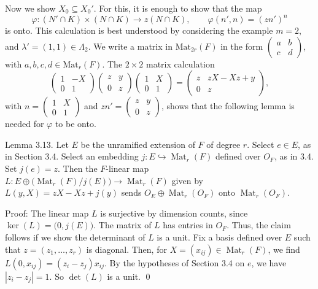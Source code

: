 \documentclass{amsart}
\begin{document}
Now we show $X_0\subseteq X_0'$.  For this, it is enough to show
that the map $$\varphi:(N'\cap K)\times (N\cap K)\to z(N\cap K),\qquad
      \varphi(n',n) = (zn')^n$$
is onto.  This calculation is best understood by considering the
example $m=2$, and $\lambda'=(1,1)\in \Lambda_2$.
We write a matrix in $\text{Mat}_{2r}(F)$ in the form
$\begin{pmatrix}  a&b\\c&d\end{pmatrix}$, with $a,b,c,d\in\text{Mat}_r(F)$.
The $2\times2$ matrix calculation
%
$$\begin{pmatrix}  1&-X\\0&1\end{pmatrix}
  \begin{pmatrix}  z&y\\0&z\end{pmatrix}
  \begin{pmatrix}  1&X\\0&1\end{pmatrix} =
  \begin{pmatrix}  z& zX-Xz+y\\0&z\end{pmatrix},$$
  with 
  $n=\begin{pmatrix} 1&X\\0&1\end{pmatrix}$ and 
  $zn'=\begin{pmatrix}  z&y\\0&z\end{pmatrix}$,
%
shows that the following lemma is needed for $\varphi$ to be onto.

\proclaim Lemma {3.13}.
Let $E$ be the unramified extension of $F$ of degree $r$.
Select $e\in E$, as in Section 3.4.  Select an embedding
  $ j : E \hookrightarrow \operatorname{Mat}_r (F) $ defined
  over $O_F$,
as in\/ {\rm 3.4}.
Set $ j(e) = z$.
Then the $F$-linear map
  $ L :
    E \oplus 
    \bigl(
      \operatorname{Mat}_r (F) \big/ j (E)
    \bigr)
    \to
    \operatorname{Mat}_r (F) $
given by 
  $L (y,X) =z X - X z + j (y) $
sends
  $ O_E \oplus \operatorname{Mat}_r (O_F) $
{\rm onto}
  $ \operatorname{Mat}_r (O_F) $.
\finishproclaim

\pproclaim Proof:
The linear map
  $L$ is surjective by dimension counts, since
  $ \ker (L) = 
    \bigl(
       0, j (E)
    \bigr) $.
The matrix of $L$ has entries in
  $ O_F $.
Thus, the claim follows if we show the determinant of $L$ is a unit.
Fix a basis defined over $E$ such that 
  $ z = (z_1,\ldots,z_r) $ 
is diagonal.
Then, for
  $ X= (x_{ij}) \in \operatorname{Mat}_r (F) $,
  we find $ L(0,x_{ij}) = (z_i - z_j) x_{ij} $.
By the hypotheses of Section 3.4 on $e$, we have
  $ |z_i - z_j| = 1 $.
So 
  $ \det (L) $
is a unit.
\qed
\finishpproclaim
\end{document}
